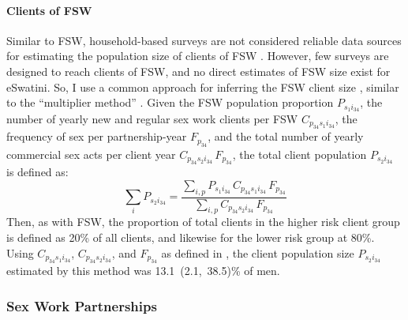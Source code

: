 \paragraph{Clients of FSW}
Similar to FSW, household-based surveys are not considered reliable data sources
for estimating the population size of clients of FSW \cite{Behanzin2013}.
However, few surveys are designed to reach clients of FSW,
and no direct estimates of FSW size exist for eSwatini.
So, I use a common approach for inferring the FSW client size \cite{Cote2004},
similar to the ``multiplier method'' \cite{Morison2001}.
Given the FSW population proportion $P_{s_{1}i_{34}}$,
the number of yearly new and regular sex work clients per FSW $C_{p_{34}s_{1}i_{34}}$,
the frequency of sex per partnership-year $F_{p_{34}}$, and
the total number of yearly commercial sex acts per client year $C_{p_{34}s_{2}i_{34}}\,F_{p_{34}}$,
the total client population $P_{s_{2}i_{34}}$ is defined as:
\begin{equation}
  {\textstyle\sum_{i}} P_{s_{2}i_{34}} =
  \frac{\sum_{i,p} P_{s_{1}i_{34}}\,C_{p_{34}s_{1}i_{34}}\,F_{p_{34}}}
       {\sum_{i,p} C_{p_{34}s_{2}i_{34}}\,F_{p_{34}}}
  \label{eq:model.fsw.cli.tot}
\end{equation}
Then, as with FSW, the proportion of total clients in the higher risk client group
is defined as 20\% of all clients, and likewise for the lower risk group at 80\%.
Using $C_{p_{34}s_{1}i_{34}}$, $C_{p_{34}s_{2}i_{34}}$, and $F_{p_{34}}$
as defined in , the client population size $P_{s_{2}i_{34}}$
estimated by this method was 13.1~(2.1,~38.5)\% of men. %
\subsubsection{Sex Work Partnerships}\label{model.par.sw.part}
